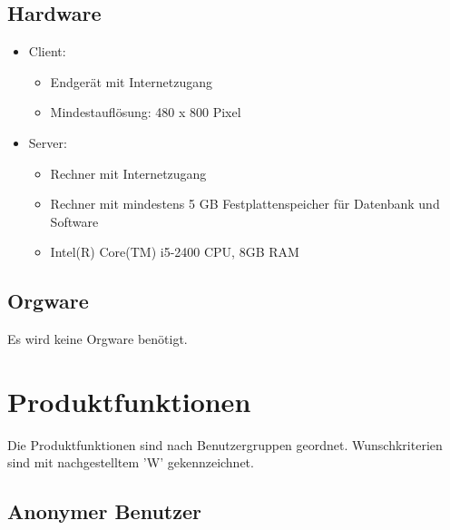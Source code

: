 \documentclass[a4paper]{scrreprt}
\newcounter{Lc}
\newcounter{Hc}
\newcommand{\resetAllCounter}{\setcounter{Lc}{0}\setcounter{Hc}{1}}
\begin{document}
    \section{Hardware}   
        \begin{itemize}
          	\item Client:
	            \begin{itemize}
	            	\item Endgerät mit Internetzugang
	            	\item Mindestauflösung: 480 x 800 Pixel
	            \end{itemize}
          	\item Server:
	           \begin{itemize}
		           	\item Rechner mit Internetzugang
		           	\item Rechner mit mindestens 5 GB Festplattenspeicher für Datenbank und Software
		           	\item Intel(R) Core(TM) i5-2400 CPU, 8GB RAM 
	           \end{itemize}
        \end{itemize}
        
     \section{Orgware}
             Es wird keine \gls{Orgware} benötigt.

\resetAllCounter
\newcommand{\Func}[1]{\stepcounter{Lc}\textcolor{Blue}{\textbf{/F\arabic{Hc}0-\arabic{Lc}0/} #1} \\}
\newcommand{\FuncW}[1]{\stepcounter{Lc}\textcolor{Green}{\textbf{/F\arabic{Hc}0-\arabic{Lc}0W/} #1} \\}
\newcommand{\FuncBlue}[1]{\textcolor{Blue}{\textbf{#1}}}
\newcommand{\FuncGreen}[1]{\textcolor{Green}{\textbf{#1}}}

\chapter{Produktfunktionen}
Die Produktfunktionen sind nach Benutzergruppen geordnet. Wunschkriterien sind mit nachgestelltem 'W' gekennzeichnet.
	\section{Anonymer Benutzer}
\end{document}
